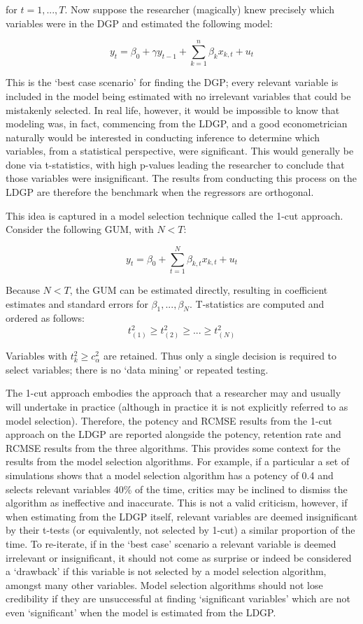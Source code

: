 \documentclass[11pt, oneside]{book}   	%
\begin{document}
for $t=1,...,T$. Now suppose the researcher (magically) knew precisely which variables were in the DGP and estimated the following model:

$$y_{t}=\beta_{0} + \gamma y_{t-1}+\sum_{k=1}^{n}\beta_{k}x_{k,t} + u_{t} $$

This is the `best case scenario' for finding the DGP; every relevant variable is included in the model being estimated with no irrelevant variables that could be mistakenly selected. In real life, however, it would be impossible to know that modeling was, in fact, commencing from the LDGP, and a good econometrician naturally would be interested in conducting inference to determine which variables, from a statistical perspective, were significant. This would generally be done via t-statistics, with high p-values leading the researcher to conclude that those variables were insignificant. The results from conducting this process on the LDGP are therefore the benchmark when the regressors are orthogonal. 

This idea is captured in a model selection technique called the 1-cut approach. Consider the following GUM, with $N<T$:

$$y_{t} = \beta_{0} + \sum_{t=1}^{N}\beta_{k,t}x_{k,t} + u_{t}$$

Because $N<T$, the GUM can be estimated directly, resulting in coefficient estimates and standard errors for $\beta_{1},...,\beta_{N}$. T-statistics are computed and ordered as follows: 
$$t_{(1)}^{2} \geq t_{(2)}^{2} \geq ... \geq  t_{(N)}^{2}$$

Variables with $t_{k}^{2} \geq c_{\alpha}^{2}$ are retained. Thus only a single decision is required to select variables; there is no `data mining' or repeated testing. 

The 1-cut approach embodies the approach that a researcher may and usually will undertake in practice (although in practice it is not explicitly referred to as model selection). Therefore, the potency and RCMSE results from the 1-cut approach on the LDGP are reported alongside the potency, retention rate and RCMSE results from the three algorithms. This provides some context for the results from the model selection algorithms. For example, if a particular a set of simulations shows that a model selection algorithm has a potency of 0.4 and selects relevant variables 40\% of the time, critics may be inclined to dismiss the algorithm as ineffective and inaccurate. This is not a valid criticism, however, if when estimating from the LDGP itself, relevant variables are deemed insignificant by their t-tests (or equivalently, not selected by 1-cut) a similar proportion of the time. To re-iterate, if in the `best case' scenario a relevant variable is deemed irrelevant or insignificant, it should not come as surprise or indeed be considered a `drawback' if this variable is not selected by a model selection algorithm, amongst many other variables. Model selection algorithms should not lose credibility if they are unsuccessful at finding `significant variables' which are not even `significant' when the model is estimated from the LDGP. 
\end{document}
